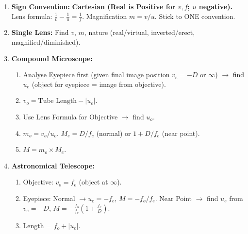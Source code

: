 \documentclass[11pt]{article}
\begin{document}
\begin{methode}
\begin{enumerate}
\item \textbf{Sign Convention:} \textbf{Cartesian (Real is Positive for $v,f$; $u$ negative).} Lens formula: $\frac{1}{v} - \frac{1}{u} = \frac{1}{f}$. Magnification $m = v/u$. Stick to ONE convention.
\item \textbf{Single Lens:} Find $v$, $m$, nature (real/virtual, inverted/erect, magnified/diminished).
\item \textbf{Compound Microscope:}
\begin{enumerate}
\item Analyse Eyepiece first (given final image position $v_e = -D$ or $\infty$) $\rightarrow$ find $u_e$ (object for eyepiece = image from objective).
\item $v_o = \text{Tube Length} - |u_e|$.
\item Use Lens Formula for Objective $\rightarrow$ find $u_o$.
\item $m_o = v_o/u_o$. $M_e = D/f_e$ (normal) or $1+D/f_e$ (near point).
\item $M = m_o \times M_e$.
\end{enumerate}
\item \textbf{Astronomical Telescope:}
\begin{enumerate}
\item Objective: $v_o = f_o$ (object at $\infty$).
\item Eyepiece: Normal $\rightarrow u_e = -f_e$, $M = -f_o/f_e$. Near Point $\rightarrow$ find $u_e$ from $v_e = -D$, $M = -\frac{f_o}{f_e}(1+\frac{f_e}{D})$.
\item Length = $f_o + |u_e|$.
\end{enumerate}
\end{enumerate}
\end{methode}
\end{document}
